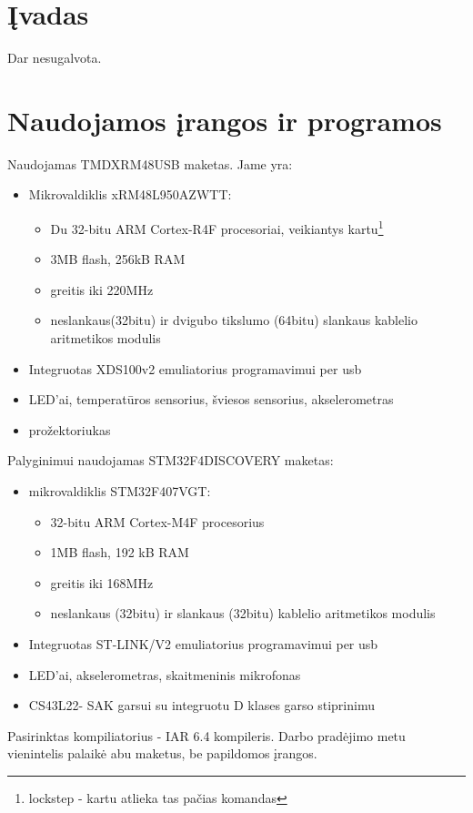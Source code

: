 \documentclass[a4paper, 12pt]{article} %
\begin{document}
\begin{onehalfspacing}

\section*{\k{I}vadas} %


Dar nesugalvota.

\newpage

\section{Naudojamos \k{i}rangos ir programos}
Naudojamas TMDXRM48USB maketas. Jame yra:
\begin{itemize}
\item Mikrovaldiklis xRM48L950AZWTT:
\begin{itemize}
\item Du 32-bitu ARM Cortex-R4F procesoriai, veikiantys kartu\footnote{lockstep - kartu atlieka tas pa\v{c}ias komandas}
\item 3MB flash, 256kB RAM
\item greitis iki 220MHz
\item neslankaus(32bitu) ir dvigubo tikslumo (64bitu) slankaus kablelio aritmetikos modulis
\end{itemize} 
\item Integruotas XDS100v2 emuliatorius programavimui per usb
\item LED'ai, temperat\=uros sensorius, \v{s}viesos sensorius, akselerometras
\item pro\v{z}ektoriukas
\end{itemize}
Palyginimui naudojamas STM32F4DISCOVERY maketas:
\begin{itemize}
\item mikrovaldiklis STM32F407VGT:
\begin{itemize}
\item 32-bitu ARM Cortex-M4F procesorius
\item 1MB flash, 192 kB RAM 
\item greitis iki 168MHz 
\item neslankaus (32bitu) ir slankaus (32bitu) kablelio aritmetikos modulis
\end{itemize}
\item Integruotas ST-LINK/V2 emuliatorius programavimui per usb
\item LED'ai, akselerometras, skaitmeninis mikrofonas
\item CS43L22- SAK garsui su integruotu D klases garso stiprinimu
\end{itemize}
Pasirinktas kompiliatorius - IAR 6.4 kompileris. Darbo prad\.ejimo metu vienintelis palaik\.e abu maketus, be papildomos \k{i}rangos. 
    


\end{onehalfspacing}
\end{document}
